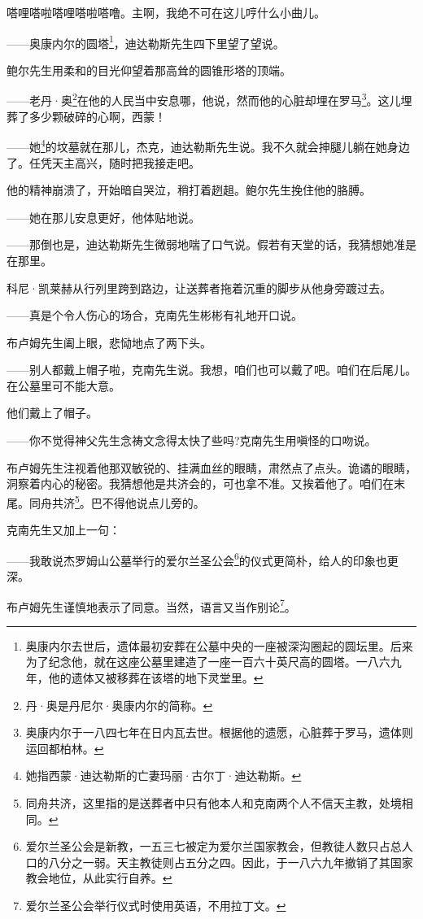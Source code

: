 \par 嗒哩嗒啦嗒哩嗒啦嗒噜。主啊，我绝不可在这儿哼什么小曲儿。
\par ——奥康内尔的圆塔\footnote{奥康内尔去世后，遗体最初安葬在公墓中央的一座被深沟圈起的圆坛里。后来为了纪念他，就在这座公墓里建造了一座一百六十英尺高的圆塔。一八六九年，他的遗体又被移葬在该塔的地下灵堂里。}，迪达勒斯先生四下里望了望说。
\par 鲍尔先生用柔和的目光仰望着那高耸的圆锥形塔的顶端。
\par ——老丹·奥\footnote{丹·奥是丹尼尔·奥康内尔的简称。}在他的人民当中安息哪，他说，然而他的心脏却埋在罗马\footnote{奥康内尔于一八四七年在日内瓦去世。根据他的遗愿，心脏葬于罗马，遗体则运回都柏林。}。这儿埋葬了多少颗破碎的心啊，西蒙！
\par ——她\footnote{她指西蒙·迪达勒斯的亡妻玛丽·古尔丁·迪达勒斯。}的坟墓就在那儿，杰克，迪达勒斯先生说。我不久就会抻腿儿躺在她身边了。任凭天主高兴，随时把我接走吧。
\par 他的精神崩溃了，开始暗自哭泣，稍打着趔趄。鲍尔先生挽住他的胳膊。
\par ——她在那儿安息更好，他体贴地说。
\par ——那倒也是，迪达勒斯先生微弱地喘了口气说。假若有天堂的话，我猜想她准是在那里。
\par 科尼·凯莱赫从行列里跨到路边，让送葬者拖着沉重的脚步从他身旁踱过去。
\par ——真是个令人伤心的场合，克南先生彬彬有礼地开口说。
\par 布卢姆先生阖上眼，悲恸地点了两下头。
\par ——别人都戴上帽子啦，克南先生说。我想，咱们也可以戴了吧。咱们在后尾儿。在公墓里可不能大意。
\par 他们戴上了帽子。
\par ——你不觉得神父先生念祷文念得太快了些吗?克南先生用嗔怪的口吻说。
\par 布卢姆先生注视着他那双敏锐的、挂满血丝的眼睛，肃然点了点头。诡谲的眼睛，洞察着内心的秘密。我猜想他是共济会的，可也拿不准。又挨着他了。咱们在末尾。同舟共济\footnote{同舟共济，这里指的是送葬者中只有他本人和克南两个人不信天主教，处境相同。}。巴不得他说点儿旁的。
\par 克南先生又加上一句：
\par ——我敢说杰罗姆山公墓举行的爱尔兰圣公会\footnote{爱尔兰圣公会是新教，一五三七被定为爱尔兰国家教会，但教徒人数只占总人口的八分之一弱。天主教徒则占五分之四。因此，于一八六九年撤销了其国家教会地位，从此实行自养。}的仪式更简朴，给人的印象也更深。
\par 布卢姆先生谨慎地表示了同意。当然，语言又当作别论\footnote{爱尔兰圣公会举行仪式时使用英语，不用拉丁文。}。

